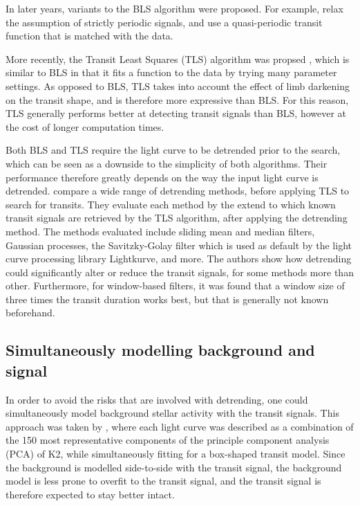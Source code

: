 In later years, variants to the BLS algorithm were proposed. For example, \cite{carter2013quasiperiodic} relax the assumption of strictly periodic signals, and use a quasi-periodic transit function that is matched with the data.

More recently, the Transit Least Squares (TLS) algorithm was propsed \citep{hippke2019optimized}, which is similar to BLS in that it fits a function to the data by trying many parameter settings. As opposed to BLS, TLS takes into account the effect of limb darkening on the transit shape, and is therefore more expressive than BLS. For this reason, TLS generally performs better at detecting transit signals than BLS, however at the cost of longer computation times.  

Both BLS and TLS require the light curve to be detrended prior to the search, which can be seen as a downside to the simplicity of both algorithms. Their performance therefore greatly depends on the way the input light curve is detrended. \cite{hippke2019wotan} compare a wide range of detrending methods, before applying TLS to search for transits. They evaluate each method by the extend to which known transit signals are retrieved by the TLS algorithm, after applying the detrending method. The methods evaluated include sliding mean and median filters, Gaussian processes, the Savitzky-Golay filter which is used as default by the light curve processing library Lightkurve, and more. The authors show how detrending could significantly alter or reduce the transit signals, for some methods more than other. Furthermore, for window-based filters, it was found that a window size of three times the transit duration works best, but that is generally not known beforehand.


\subsection{Simultaneously modelling background and signal}
In order to avoid the risks that are involved with detrending, one could simultaneously model background stellar activity with the transit signals. This approach was taken by \cite{foreman2015systematic}, where each light curve was described as a combination of the 150 most representative components of the principle component analysis (PCA) of K2, while simultaneously fitting for a box-shaped transit model. Since the background is modelled side-to-side with the transit signal, the background model is less prone to overfit to the transit signal, and the transit signal is therefore expected to stay better intact.

